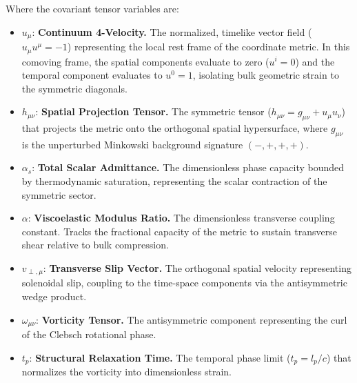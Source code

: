 Where the covariant tensor variables are:
    \begin{itemize}[noitemsep]
    \item $u_\mu$: \textbf{Continuum 4-Velocity.} The normalized, timelike vector field ($u_\mu u^\mu = -1$) representing the local rest frame of the coordinate metric. In this comoving frame, the spatial components evaluate to zero ($u^i = 0$) and the temporal component evaluates to $u^0 = 1$, isolating bulk geometric strain to the symmetric diagonals. 
    \item $h_{\mu\nu}$: \textbf{Spatial Projection Tensor.} The symmetric tensor ($h_{\mu\nu} = g_{\mu\nu} + u_\mu u_\nu$) that projects the metric onto the orthogonal spatial hypersurface, where $g_{\mu\nu}$ is the unperturbed Minkowski background signature $(-,+,+,+)$.
    \item $\alpha_s$: \textbf{Total Scalar Admittance.} The dimensionless phase capacity bounded by thermodynamic saturation, representing the scalar contraction of the symmetric sector. 
    \item $\alpha$: \textbf{Viscoelastic Modulus Ratio.} The dimensionless transverse coupling constant. Tracks the fractional capacity of the metric to sustain transverse shear relative to bulk compression. 
    \item $v_{\perp, \mu}$: \textbf{Transverse Slip Vector.} The orthogonal spatial velocity representing solenoidal slip, coupling to the time-space components via the antisymmetric wedge product.
    \item $\omega_{\mu\nu}$: \textbf{Vorticity Tensor.} The antisymmetric component representing the curl of the Clebsch rotational phase.
    \item $t_p$: \textbf{Structural Relaxation Time.} The temporal phase limit ($t_p = l_p/c$) that normalizes the vorticity into dimensionless strain.
\end{itemize}

